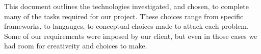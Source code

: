 This document outlines the technologies investigated, and chosen, to complete many of the tasks required for our project.
These choices range from specific frameworks, to langauges, to conceptual choices made to attack each problem.
Some of our requirements were imposed by our client, but even in those cases we had room for creativeity and choices to make.

